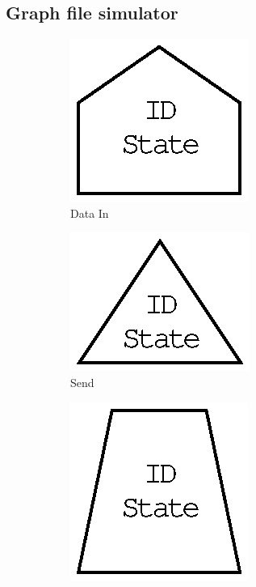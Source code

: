 \subsection{Graph file simulator}
\begin{figure}%
    \centering
    \begin{subfigure}[b]{0.16\textwidth}
        \centering
        \includegraphics[scale=0.45]{evaluation/dot_files/datain.eps}
        \caption{Data In}
        \label{fig:packet_graph_datain}
    \end{subfigure}%
    \begin{subfigure}[b]{0.16\textwidth}
        \centering
        \includegraphics[scale=0.45]{evaluation/dot_files/send.eps}
        \caption{Send}
        \label{fig:packet_graph_send}
    \end{subfigure}%
    \begin{subfigure}[b]{0.16\textwidth}
        \centering
        \includegraphics[scale=0.45]{evaluation/dot_files/command.eps}

\end{subfigure}
\end{figure}
